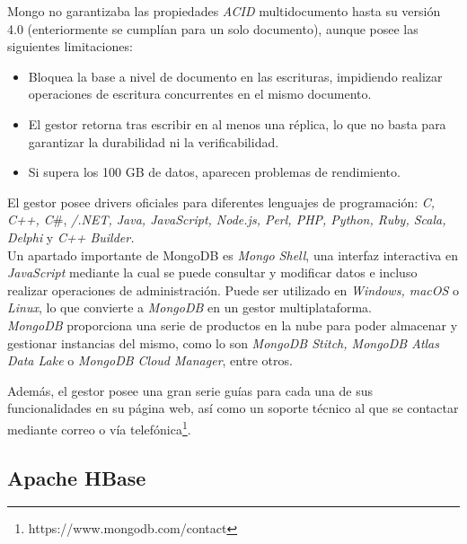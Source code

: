 \documentclass{article}
\begin{document}
Mongo no garantizaba las propiedades \emph{ACID} multidocumento hasta su versión 4.0 (enteriormente se cumplían para un solo documento), aunque posee las siguientes limitaciones\cite{WIKI:15}: 

\begin{itemize}
	\item Bloquea la base a nivel de documento en las escrituras, impidiendo realizar operaciones de escritura concurrentes en el mismo documento. 
	\item El gestor retorna tras escribir en al menos una réplica, lo que no basta para garantizar la durabilidad ni la verificabilidad.\cite{MDB:9}
	\item Si supera los 100 GB de datos, aparecen problemas de rendimiento.\cite{MDB:10}
\end{itemize}

El gestor posee drivers oficiales para diferentes lenguajes de programación: \emph{C, C++, C}\#, \emph{/.NET, Java, JavaScript, Node.js, Perl, PHP, Python, Ruby, Scala, Delphi} y \emph{C++ Builder.}\\

Un apartado importante de MongoDB es \emph{Mongo Shell}\cite{MDB:6}, una interfaz interactiva en \emph{JavaScript} mediante la cual se puede consultar y modificar datos e incluso realizar operaciones de administración. Puede ser utilizado en \emph{Windows, macOS} o \emph{Linux}, lo que convierte a \emph{MongoDB} en un gestor multiplataforma.\\

\emph{MongoDB} proporciona una serie de productos en la nube para poder almacenar y gestionar instancias del mismo, como lo son \emph{MongoDB Stitch, MongoDB Atlas Data Lake} o \emph{MongoDB Cloud Manager}, entre otros.\cite{MDB:7}

Además, el gestor posee una gran serie guías para cada una de sus funcionalidades en su página web\cite{MDB:8}, así como un soporte técnico al que se contactar mediante correo o vía telefónica\footnote{https://www.mongodb.com/contact}.

\subsection{Apache HBase}
\end{document}
